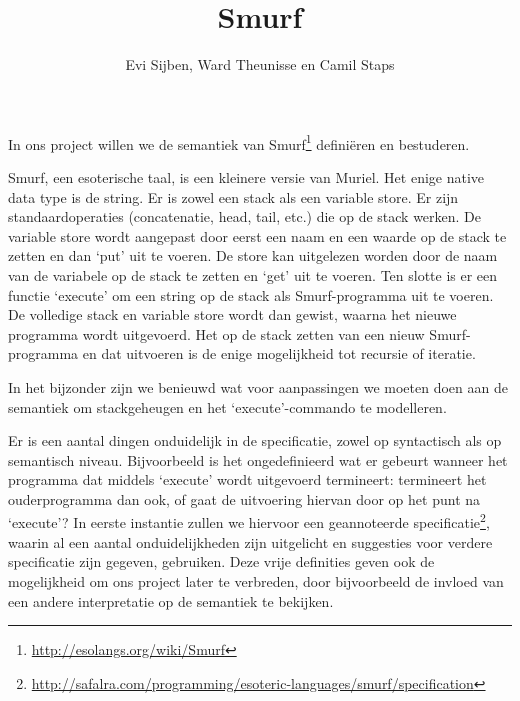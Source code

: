 \documentclass[a4paper]{article}
\title{Smurf}
\author{Evi Sijben, Ward Theunisse en Camil Staps}
\begin{document}
\maketitle

In ons project willen we de semantiek van
Smurf\footnote{\url{http://esolangs.org/wiki/Smurf}}
defini\"eren en bestuderen.

Smurf, een esoterische taal, is een kleinere versie van Muriel. Het enige
native data type is de string. Er is zowel een stack als een variable store.
Er zijn standaardoperaties (concatenatie, head, tail, etc.) die op de stack
werken. De variable store wordt aangepast door eerst een naam en een waarde op
de stack te zetten en dan `put' uit te voeren. De store kan uitgelezen worden
door de naam van de variabele op de stack te zetten en `get' uit te voeren.
Ten slotte is er een functie `execute' om een string op de stack als
Smurf-programma uit te voeren. De volledige stack en variable store wordt dan 
gewist, waarna het nieuwe programma wordt uitgevoerd. Het op de stack zetten
van een nieuw Smurf-programma en dat uitvoeren is de enige mogelijkheid tot
recursie of iteratie.

In het bijzonder zijn we benieuwd wat voor aanpassingen we moeten doen aan de
semantiek om stackgeheugen en het `execute'-commando te modelleren.

Er is een aantal dingen onduidelijk in de specificatie, zowel op syntactisch
als op semantisch niveau. Bijvoorbeeld is het ongedefinieerd wat er gebeurt
wanneer het programma dat middels `execute' wordt uitgevoerd termineert:
termineert het ouderprogramma dan ook, of gaat de uitvoering hiervan door op
het punt na `execute'? In eerste instantie zullen we hiervoor een geannoteerde
specificatie\footnote{\url{http://safalra.com/programming/esoteric-languages/smurf/specification}},
waarin al een aantal onduidelijkheden zijn uitgelicht en suggesties voor
verdere specificatie zijn gegeven, gebruiken. Deze vrije definities geven
ook de mogelijkheid om ons project later te verbreden, door bijvoorbeeld de
invloed van een andere interpretatie op de semantiek te bekijken.
\end{document}
